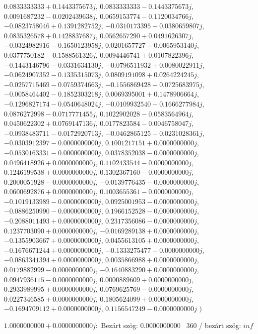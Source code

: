 \documentclass[14pt,a4paper]{article}
\begin{document}
\begin{itemize}
$0.0833333333+0.1443375673j$, $0.0833333333-0.1443375673j$, $0.0091687232-0.0202439638j$, $0.0659153774-0.1120034766j$, $-0.0823758046+0.1391282752j$, $-0.0310173395-0.0380659807j$, $0.0835326578+0.1428837687j$, $0.0562657290+0.0491626307j$, $-0.0324982916-0.1650123958j$, $0.0201657727-0.0065953140j$, $0.0377750182-0.1588561326j$, $0.0094446741+0.0107822396j$, $-0.1443146796-0.0331634130j$, $-0.0796511932+0.0080022911j$, $-0.0624907352-0.1335315073j$, $0.0809191098+0.0264224245j$, $-0.0257715469-0.0759374663j$, $-0.1556869428-0.0725683975j$, $-0.0058464402-0.1852303218j$, $0.0069395001+0.1478906664j$, $-0.1296827174-0.0540648024j$, $-0.0109932540-0.1666277984j$, $0.0876272998-0.0717771455j$, $0.1022902028-0.0583564964j$, $0.0450622302+0.0769147136j$, $0.0177823584-0.0046758047j$, $-0.0938483711-0.0172920713j$, $-0.0462865125-0.0231028361j$, $-0.0303912397-0.0000000000j$, $0.1001217151+0.0000000000j$, $-0.0530163331-0.0000000000j$, $0.0378352038-0.0000000000j$, $0.0496418926+0.0000000000j$, $0.1102433544-0.0000000000j$, $0.1246199538+0.0000000000j$, $0.1302367160-0.0000000000j$, $0.2000051928-0.0000000000j$, $-0.0139776435-0.0000000000j$, $0.0600692876+0.0000000000j$, $0.1003655361-0.0000000000j$, $-0.1019133989-0.0000000000j$, $0.0925001953-0.0000000000j$, $-0.0886250990-0.0000000000j$, $0.1966152528-0.0000000000j$, $-0.2088011493+0.0000000000j$, $0.2317356086-0.0000000000j$, $0.1237703090+0.0000000000j$, $-0.0169289138+0.0000000000j$, $-0.1355903667+0.0000000000j$, $0.0455613105+0.0000000000j$, $-0.1676671244+0.0000000000j$, $-0.1333275477-0.0000000000j$, $-0.0863341394+0.0000000000j$, $0.0035866988+0.0000000000j$, $0.0179882999-0.0000000000j$, $-0.1640883290+0.0000000000j$, $0.0947936115-0.0000000000j$, $0.0000889609+0.0000000000j$, $0.2933989995+0.0000000000j$, $0.0769625769-0.0000000000j$, $0.0227346585+0.0000000000j$, $0.1805624099+0.0000000000j$, $-0.1694709112+0.0000000000j$, $0.1156547249-0.0000000000j$
$\big)$
\end{itemize}
$1.0000000000+0.0000000000j$:\
Bezárt szög: $0.0000000000$ \
360 / bezárt szög: $inf$\
\end{document}
